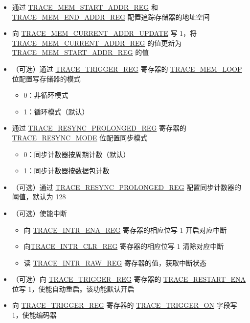 \documentclass[main\_\_CN.tex]{subfiles}
\begin{document}
\begin{itemize}
    \item 通过 \hyperref[regdesc:TRACEMEMSTARTADDRREG]{TRACE\_MEM\_START\_ADDR\_REG} 和 \hyperref[regdesc:TRACEMEMENDADDRREG]{TRACE\_MEM\_END\_ADDR\_REG} 配置追踪存储器的地址空间

    \item 向 \hyperref[fielddesc:TRACEMEMCURRENTADDRUPDATE]{TRACE\_MEM\_CURRENT\_ADDR\_UPDATE} 写 1，将 \hyperref[regdesc:TRACEMEMCURRENTADDRREG]{TRACE\_MEM\_CURRENT\_ADDR\_REG} 的值更新为 \hyperref[regdesc:TRACEMEMSTARTADDRREG]{TRACE\_MEM\_START\_ADDR\_REG} 的值

    \item（可选）通过 \hyperref[regdesc:TRACETRIGGERREG]{TRACE\_TRIGGER\_REG} 寄存器的 \hyperref[fielddesc:TRACEMEMLOOP]{TRACE\_MEM\_LOOP} 位配置写存储器的模式
        \begin{itemize}
            \item 0：非循环模式
            \item 1：循环模式（默认）
        \end{itemize}

    \item 通过 \hyperref[regdesc:TRACERESYNCPROLONGEDREG]{TRACE\_RESYNC\_PROLONGED\_REG} 寄存器的 \hyperref[fielddesc:TRACERESYNCMODE]{TRACE\_RESYNC\_MODE} 位配置同步模式
        \begin{itemize}
                    \item 0：同步计数器按周期计数（默认）
                    \item 1：同步计数器按数据包计数
                \end{itemize}

    \item（可选）通过 \hyperref[regdesc:TRACERESYNCPROLONGEDREG]{TRACE\_RESYNC\_PROLONGED\_REG} 配置同步计数器的阈值，默认为 128

    \item（可选）使能中断
        \begin{itemize}
            \item 向 \hyperref[regdesc:TRACEINTRENAREG]{TRACE\_INTR\_ENA\_REG} 寄存器的相应位写 1 开启对应中断
            \item 向\hyperref[regdesc:TRACEINTRCLRREG]{TRACE\_INTR\_CLR\_REG} 寄存器的相应位写 1 清除对应中断
            \item 读 \hyperref[regdesc:TRACEINTRRAWREG]{TRACE\_INTR\_RAW\_REG} 寄存器的值，获取中断状态
        \end{itemize}

    \item （可选）向 \hyperref[regdesc:TRACETRIGGERREG]{TRACE\_TRIGGER\_REG} 寄存器的 \hyperref[fielddesc:TRACERESTARTENA]{TRACE\_RESTART\_ENA} 位写 1，使能自动重启。该功能默认开启

    \item 向 \hyperref[regdesc:TRACETRIGGERREG]{TRACE\_TRIGGER\_REG} 寄存器的 \hyperref[fielddesc:TRACETRIGGERON]{TRACE\_TRIGGER\_ON} 字段写 1，使能编码器

\end{itemize}
\end{document}
